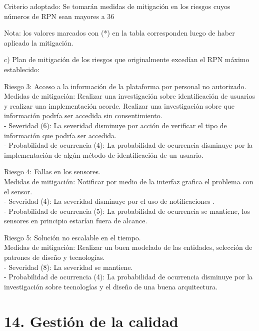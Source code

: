 \documentclass[
11pt, %
]{charter}
\begin{document}
Criterio adoptado: 
Se tomarán medidas de mitigación en los riesgos cuyos números de RPN sean mayores a 36

Nota: los valores marcados con (*) en la tabla corresponden luego de haber aplicado la mitigación.

c) Plan de mitigación de los riesgos que originalmente excedían el RPN máximo establecido:
 
Riesgo 3: Acceso a la información de la plataforma por personal no autorizado.\\
Medidas de mitigación: Realizar una investigación sobre identificación de usuarios y realizar una implementación acorde. Realizar una investigación sobre que información podría ser accedida sin consentimiento.\\
  - Severidad (6): La severidad disminuye por acción de verificar el tipo de información que podría ser accedida.\\
  - Probabilidad de ocurrencia (4): La probabilidad de ocurrencia disminuye por la implementación de algún método de identificación de un usuario.

Riesgo 4: Fallas en los sensores.\\
Medidas de mitigación: Notificar por medio de la interfaz grafica el problema con el sensor.\\
  - Severidad (4): La severidad disminuye por el uso de notificaciones .\\
  - Probabilidad de ocurrencia (5): La probabilidad de ocurrencia se mantiene, los sensores en principio estarían fuera de alcance.
  
Riesgo 5: Solución no escalable en el tiempo.\\
Medidas de mitigación: Realizar un buen modelado de las entidades, selección de patrones de diseño y tecnologías.\\
  - Severidad (8): La severidad se mantiene.\\
  - Probabilidad de ocurrencia (4): La probabilidad de ocurrencia disminuye por la investigación sobre tecnologías y el diseño de una buena arquitectura.



\section{14. Gestión de la calidad}
\label{sec:calidad}
\end{document}
